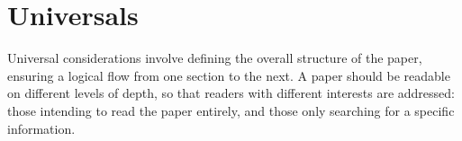 
\chapter{Universals}
\label{ch:universals}

Universal considerations involve defining the overall structure of the paper, ensuring a logical flow from one section to the next.
A paper should be readable on different levels of depth, so that readers with different interests are addressed:
those intending to read the paper entirely, and those only searching for a specific information.






